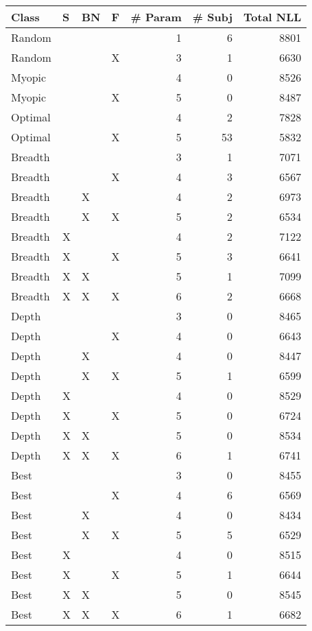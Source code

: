 \begin{tabular}{llllrrr}
\toprule
   Class &  S & BN &  F &  \# Param &  \# Subj &  Total NLL \\
\midrule
  Random &    &    &    &        1 &       6 &       8801 \\
  Random &    &    &  X &        3 &       1 &       6630 \\
  Myopic &    &    &    &        4 &       0 &       8526 \\
  Myopic &    &    &  X &        5 &       0 &       8487 \\
 Optimal &    &    &    &        4 &       2 &       7828 \\
 Optimal &    &    &  X &        5 &      53 &       5832 \\
 Breadth &    &    &    &        3 &       1 &       7071 \\
 Breadth &    &    &  X &        4 &       3 &       6567 \\
 Breadth &    &  X &    &        4 &       2 &       6973 \\
 Breadth &    &  X &  X &        5 &       2 &       6534 \\
 Breadth &  X &    &    &        4 &       2 &       7122 \\
 Breadth &  X &    &  X &        5 &       3 &       6641 \\
 Breadth &  X &  X &    &        5 &       1 &       7099 \\
 Breadth &  X &  X &  X &        6 &       2 &       6668 \\
   Depth &    &    &    &        3 &       0 &       8465 \\
   Depth &    &    &  X &        4 &       0 &       6643 \\
   Depth &    &  X &    &        4 &       0 &       8447 \\
   Depth &    &  X &  X &        5 &       1 &       6599 \\
   Depth &  X &    &    &        4 &       0 &       8529 \\
   Depth &  X &    &  X &        5 &       0 &       6724 \\
   Depth &  X &  X &    &        5 &       0 &       8534 \\
   Depth &  X &  X &  X &        6 &       1 &       6741 \\
    Best &    &    &    &        3 &       0 &       8455 \\
    Best &    &    &  X &        4 &       6 &       6569 \\
    Best &    &  X &    &        4 &       0 &       8434 \\
    Best &    &  X &  X &        5 &       5 &       6529 \\
    Best &  X &    &    &        4 &       0 &       8515 \\
    Best &  X &    &  X &        5 &       1 &       6644 \\
    Best &  X &  X &    &        5 &       0 &       8545 \\
    Best &  X &  X &  X &        6 &       1 &       6682 \\
\bottomrule
\end{tabular}
\unskip